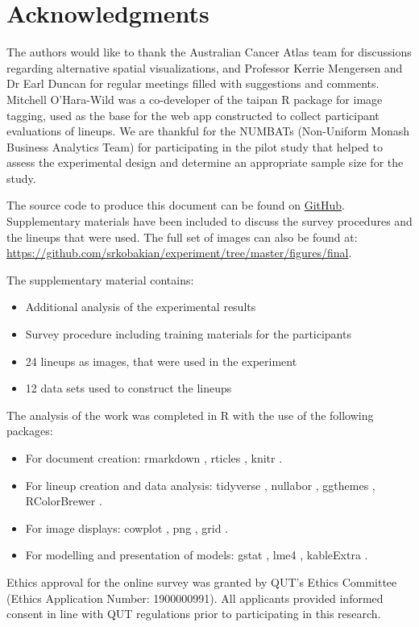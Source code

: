 \documentclass[12pt]{article}
\providecommand{\tightlist}{%
  \setlength{\itemsep}{0pt}\setlength{\parskip}{0pt}}
\begin{document}
\section{Acknowledgments}
\label{sec:ack}

The authors would like to thank the Australian Cancer Atlas team for
discussions regarding alternative spatial visualizations, and Professor
Kerrie Mengersen and Dr Earl Duncan for regular meetings filled with
suggestions and comments. Mitchell O'Hara-Wild was a co-developer of the
taipan \citep{taipan} R package for image tagging, used as the base for
the web app constructed to collect participant evaluations of lineups.
We are thankful for the NUMBATs (Non-Uniform Monash Business Analytics
Team) for participating in the pilot study that helped to assess the
experimental design and determine an appropriate sample size for the
study.

The source code to produce this document can be found on
\href{https://github.com/srkobakian/experiment/tree/master/paper}{GitHub}.
Supplementary materials have been included to discuss the survey
procedures and the lineups that were used. The full set of images can
also be found at:
\url{https://github.com/srkobakian/experiment/tree/master/figures/final}.

The supplementary material contains:

\begin{itemize}
\tightlist
\item
  Additional analysis of the experimental results
\item
  Survey procedure including training materials for the participants
\item
  24 lineups as images, that were used in the experiment
\item
  12 data sets used to construct the lineups
\end{itemize}

The analysis of the work was completed in R \citep{RCore} with the use
of the following packages:

\begin{itemize}
\tightlist
\item
  For document creation: rmarkdown \citep{rmarkdown}, rticles
  \citep{rticles}, knitr \citep{knitr}.
\item
  For lineup creation and data analysis: tidyverse \citep{tidyverse},
  nullabor \citep{nullabor}, ggthemes \citep{ggthemes}, RColorBrewer
  \citep{RColorBrewer}.
\item
  For image displays: cowplot \citep{cowplot}, png \citep{png}, grid
  \citep{grid}.
\item
  For modelling and presentation of models: gstat \citep{gstat}, lme4
  \citep{lme4}, kableExtra \citep{kableExtra}.
\end{itemize}

Ethics approval for the online survey was granted by QUT's Ethics
Committee (Ethics Application Number: 1900000991). All applicants
provided informed consent in line with QUT regulations prior to
participating in this research.

\newpage



\end{document}
